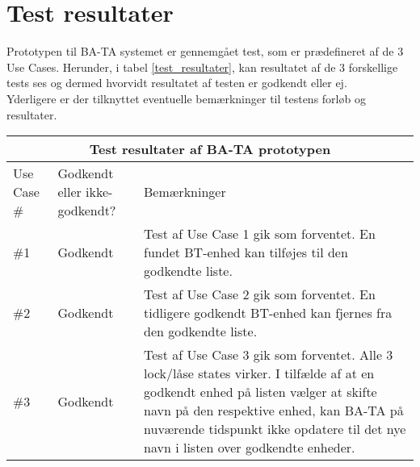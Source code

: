 \graphicspath{{Chapters/TestResultater/}}


\section{Test resultater}

Prototypen til BA-TA systemet er gennemgået test, som er prædefineret af de 3 Use Cases.
Herunder, i tabel \ref{test_resultater}, kan resultatet af de 3 forskellige tests ses og dermed hvorvidt resultatet af testen er godkendt eller ej.\\ Yderligere er der tilknyttet eventuelle bemærkninger til testens forløb og resultater.
\setlength{\tabcolsep}{18pt}

{
\centering
\label{test_resultater}
\begin{tabular}{ |p{4.2cm}|p{4.2cm}|p{4.2cm}|  }
		\hline
		\multicolumn{3}{|c|}{\textbf{Test resultater af BA-TA prototypen}} \\
		\hline
		Use Case \#& Godkendt eller ikke-godkendt? &Bemærkninger \\
		\hline
		\#1 & Godkendt & Test af Use Case 1 gik som forventet. En fundet BT-enhed kan tilføjes til den godkendte liste. \\
		\hline
		\#2 & Godkendt & Test af Use Case 2 gik som forventet. En tidligere godkendt BT-enhed kan fjernes fra den godkendte liste. \\
		\hline
		\#3 & Godkendt & Test af Use Case 3 gik som forventet. Alle 3 lock/låse states virker. I tilfælde af at en godkendt enhed på listen vælger at skifte navn på den respektive enhed, kan BA-TA på nuværende tidspunkt ikke opdatere til det nye navn i listen over godkendte enheder. \\
		\hline
\end{tabular}
}
